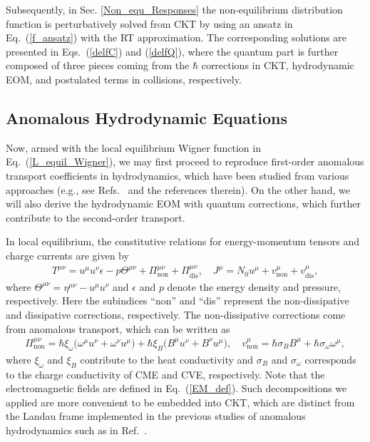\documentclass[aps,prd,showkeys,preprint,amsmath,amssymb,nofootinbib]{revtex4-1}
\begin{document}
Subsequently, in Sec. \ref{Non_equ_Responses} the non-equilibrium distribution function is perturbatively solved from CKT by using an ansatz in Eq.~(\ref{f_ansatz}) with the RT approximation. The corresponding solutions are presented in Eqs.~(\ref{delfC}) and (\ref{delfQ}), where the quantum part is further composed of three pieces coming from the $\hbar$ corrections in CKT, hydrodynamic EOM, and postulated terms in collisions, respectively.
\subsection{ Anomalous Hydrodynamic Equations}\label{Anomalous_Hydrodynamics}
Now, armed with the local equilibrium Wigner function in Eq.~(\ref{L_equil_Wigner}), we may first proceed to reproduce first-order anomalous transport coefficients in hydrodynamics, which have been studied from various approaches (e.g., see Refs.~\cite{Gao:2012ix, Landsteiner:2012kd} and the references therein). On the other hand, we will also derive the hydrodynamic EOM with quantum corrections, which further contribute to the second-order transport.  

In local equilibrium, the constitutive relations for energy-momentum tensors and charge currents are given by
\begin{eqnarray}
T^{\mu\nu}=u^{\mu}u^{\nu}\epsilon-p\Theta^{\mu\nu}+\Pi_\text{non}^{\mu\nu}+\Pi^{\mu\nu}_\text{dis},\quad J^{\mu}=N_0u^{\mu}+v_\text{non}^{\mu}+v_\text{dis}^{\mu},
\end{eqnarray}
where $\Theta^{\mu\nu}=\eta^{\mu\nu}-u^{\mu}u^{\nu}$ and $\epsilon$ and $p$ denote the energy density and pressure, respectively. Here the subindices ``non'' and ``dis'' represent the non-dissipative and dissipative corrections, respectively. 
The non-dissipative corrections come from anomalous transport, which can be written as 
\begin{eqnarray}
\Pi_\text{non}^{\mu\nu}=\hbar\xi_{\omega}\big(\omega^{\mu}u^{\nu}+\omega^{\nu}u^{\mu}\big)
+\hbar\xi_{B}\big(B^{\mu}u^{\nu}+B^{\nu}u^{\mu}\big),
\quad v_\text{non}^{\mu}=\hbar\sigma_B B^{\mu}+\hbar\sigma_{\omega}\omega^{\mu},
\end{eqnarray}
where $\xi_{\omega}$ and $\xi_{B}$ contribute to the heat conductivity and $\sigma_B$ and $\sigma_{\omega}$ corresponds to the charge conductivity of CME and CVE, respectively. Note that the electromagnetic fields are defined in Eq.~(\ref{EM_def}). 
Such decompositions we applied are more convenient to be embedded into CKT, which are distinct from the Landau frame implemented in the previous studies of anomalous hydrodynamics such as in Ref.~\cite{Son:2009tf,Yamamoto:2015ria}.
\end{document}
